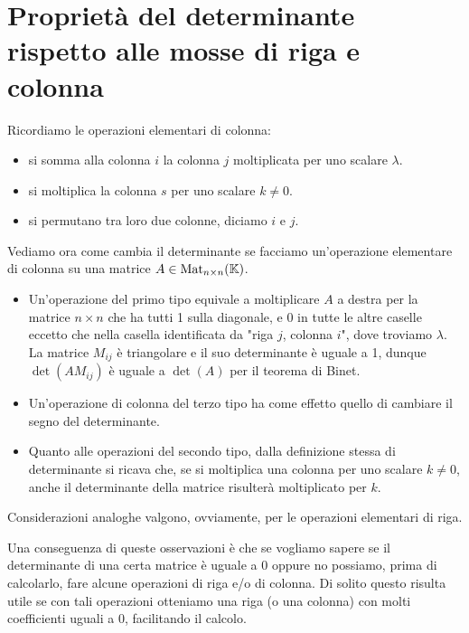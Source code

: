 \section{Proprietà del determinante rispetto alle mosse di riga e colonna}
Ricordiamo le operazioni elementari di colonna:
\begin{itemize}
	\item si somma alla colonna $i$ la colonna $j$ moltiplicata per uno
	      scalare $\lambda$.
	\item si moltiplica la colonna $s$ per uno scalare $k \neq 0$.
	\item si permutano tra loro due colonne, diciamo $i$ e $j$.
\end{itemize}

Vediamo ora come cambia il determinante se facciamo un'operazione elementare di colonna
su una matrice $A \in \operatorname{Mat}_{n \times n}(\mathbb{K})$.
\begin{itemize}
	\item Un'operazione del primo tipo equivale a moltiplicare $A$ a destra per la
	      matrice $n \times n$ che ha tutti 1 sulla diagonale, e 0 in tutte le altre
	      caselle eccetto che nella casella identificata da "riga $j$, colonna $i$",
	      dove troviamo $\lambda$. La matrice $M_{ij}$ è triangolare e il suo
	      determinante è uguale a 1, dunque $\det(AM_{ij})$ è uguale a $\det(A)$ per
	      il teorema di Binet.
	\item Un'operazione di colonna del terzo tipo ha come
	      effetto quello di cambiare il segno del determinante.
	\item Quanto alle operazioni del secondo tipo, dalla definizione stessa di
	      determinante si ricava che, se si moltiplica una colonna per uno scalare
	      $k \neq 0$, anche il determinante della matrice risulterà moltiplicato
	      per $k$.
\end{itemize}
Considerazioni analoghe valgono, ovviamente, per le operazioni elementari di riga.

Una conseguenza di queste osservazioni è che se vogliamo sapere se il
determinante di una certa matrice è uguale a 0 oppure no possiamo,
prima di calcolarlo, fare alcune operazioni di riga e/o di colonna.
Di solito questo risulta utile se con tali operazioni otteniamo una riga
(o una colonna) con molti coefficienti uguali a 0, facilitando il calcolo.